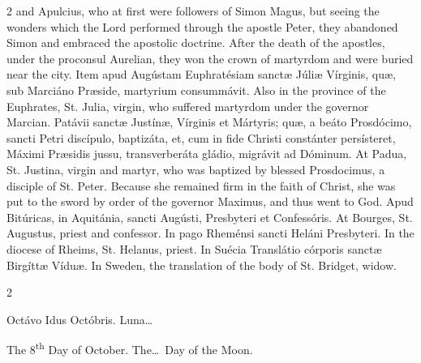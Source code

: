 \begin{paracol}{2}
 and Apulcius, who at first were followers of Simon Magus, but seeing the 
 wonders which the Lord performed through the apostle Peter, they abandoned 
 Simon and embraced the apostolic doctrine. After the death of the 
 apostles, under the proconsul Aurelian, they won the crown of martyrdom and 
 were buried near the city.
\switchcolumn*
{}
Item apud Augústam 
 Euphratésiam sanctæ Júliæ Vírginis, quæ, sub Marciáno Præside, martyrium 
 consummávit.
\switchcolumn
{}
Also in the province of the 
 Euphrates, St. Julia, virgin, who suffered martyrdom under the governor 
 Marcian.
\switchcolumn*
{}
Patávii sanctæ Justínæ, 
 Vírginis et Mártyris; quæ, a beáto Prosdócimo, sancti Petri discípulo, 
 baptizáta, et, cum in fide Christi constánter persísteret, Máximi Præsidis 
 jussu, transverberáta gládio, migrávit ad Dóminum.
\switchcolumn
{}
At Padua, St. Justina, virgin and 
 martyr, who was baptized by blessed Prosdocimus, a disciple of St. Peter. 
 Because she remained firm in the faith of Christ, she was put to the sword 
 by order of the governor Maximus, and thus went to God.
\switchcolumn*
{}
Apud Bitúricas, in 
 Aquitánia, sancti Augústi, Presbyteri et Confessóris.
\switchcolumn
{}
At Bourges, St. Augustus, priest and 
 confessor.
\switchcolumn*
{}
In pago Rheménsi sancti 
 Heláni Presbyteri.
\switchcolumn
{}
In the diocese of Rheims, St. 
 Helanus, priest.
\switchcolumn*
{}
In Suécia Translátio 
 córporis sanctæ Birgíttæ Víduæ.
\switchcolumn
{}
In Sweden, the translation of the 
 body of St. Bridget, widow.
\switchcolumn*
{}
\end{paracol}


\begin{paracol}{2}
\begin{center}{\color{gregoriocolor} Octávo Idus Octóbris. 
 Luna\dots\ }\end{center}
\switchcolumn
{}
\begin{center}{\color{gregoriocolor} The   8\textsuperscript{th} Day of 
 October. The\dots\ Day of the Moon.}\end{center}
\end{paracol}


